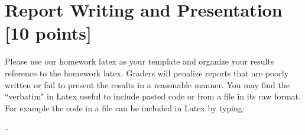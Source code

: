 \section{Report Writing and Presentation [10 points]}

Please use our homework latex as your template and organize your results reference to the homework latex.
Graders will penalize reports that are poorly written or fail to
present the results in a reasonable manner. You may find the
``verbatim" in Latex useful to include pasted code or from a file in
its raw format.
For example the code in a file
   can be included in Latex by typing:
\begin{verbatim}
.
\end{verbatim}
